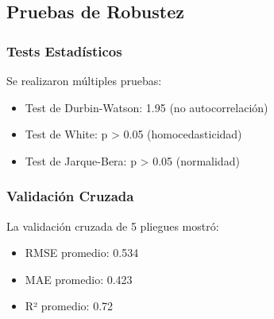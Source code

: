 \documentclass[12pt, a4paper]{article}
\begin{document}
\subsection{Pruebas de Robustez}
\subsubsection{Tests Estadísticos}
Se realizaron múltiples pruebas:
\begin{itemize}
    \item Test de Durbin-Watson: 1.95 (no autocorrelación)
    \item Test de White: p > 0.05 (homocedasticidad)
    \item Test de Jarque-Bera: p > 0.05 (normalidad)
\end{itemize}

\subsubsection{Validación Cruzada}
La validación cruzada de 5 pliegues mostró:
\begin{itemize}
    \item RMSE promedio: 0.534
    \item MAE promedio: 0.423
    \item R² promedio: 0.72
\end{itemize}

\newpage
\printbibliography
 
\end{document}
